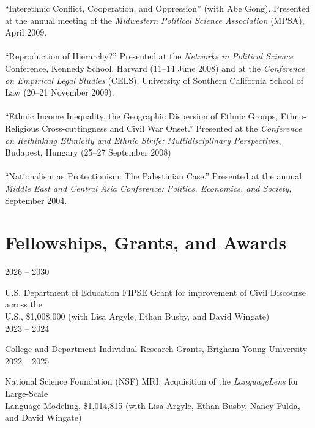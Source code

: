 \documentclass[10pt]{article}
\begin{document}
``Interethnic Conflict, Cooperation, and Oppression'' (with Abe Gong).  Presented at the annual meeting of the {\em Midwestern Political Science Association} (MPSA), April 2009.\\
\ \\
``Reproduction of Hierarchy?''  Presented at the {\em Networks in Political Science} Conference, Kennedy School, Harvard (11--14 June 2008) and at the {\em Conference on Empirical Legal Studies} (CELS), University of Southern California School of Law (20--21 November 2009).\\
\ \\
``Ethnic Income Inequality, the Geographic Dispersion of Ethnic Groups, Ethno-Religious Cross-cuttingness and Civil War Onset.'' Presented at the {\em Conference on Rethinking Ethnicity and Ethnic Strife: Multidisciplinary Perspectives}, Budapest, Hungary (25--27 September 2008)\\
\ \\
``Nationalism as Protectionism: The Palestinian Case.''  Presented at the annual {\em Middle East and Central Asia Conference: Politics, Economics, and Society}, September 2004.\normalsize\ \\[18pt]



\section{Fellowships, Grants, and Awards}

\raggedleft
\normalsize{2026 -- 2030}\par
\raggedright 
U.S. Department of Education FIPSE Grant for improvement of Civil Discourse across the\\ U.S., \$1,008,000 (with Lisa Argyle, Ethan Busby, and David Wingate)\\[3pt]

\raggedleft
\normalsize{2023 -- 2024}\par
\raggedright 
College and Department Individual Research Grants, Brigham Young University\normalsize\\[3pt]

\raggedleft
\normalsize{2022 -- 2025}\par
\raggedright 
National Science Foundation (NSF) MRI: Acquisition of the \textit{LanguageLens} for Large-Scale\\ Language Modeling, \$1,014,815 (with Lisa Argyle, Ethan Busby, Nancy Fulda, and David Wingate)\normalsize\\[3pt]
\end{document}
